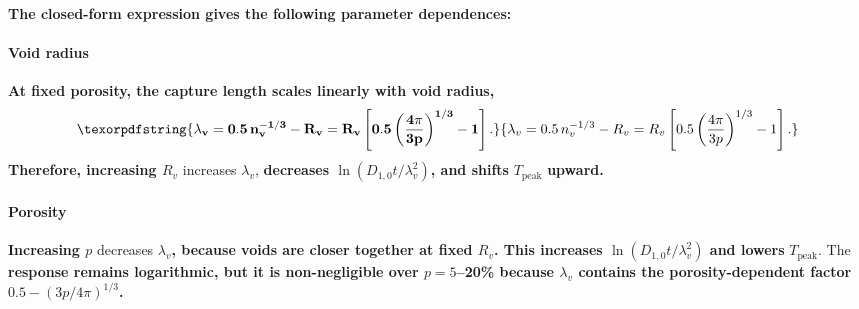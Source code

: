 \documentclass[preprint,12pt,sort&compress]{elsarticle}
\newcommand{\?}{\stackrel{?}{=}}
\providecommand{\DIFaddtex}[1]{{\bf #1}} %
\providecommand{\DIFdeltex}[1]{} %
\providecommand{\DIFaddbegin}{\protect\color{blue}} %
\providecommand{\DIFaddend}{\protect\color{black}} %
\providecommand{\DIFdelbegin}{\protect\color{red}} %
\providecommand{\DIFdelend}{\protect\color{black}} %
\providecommand{\DIFadd}[1]{\texorpdfstring{\DIFaddtex{#1}}{#1}} %
\providecommand{\DIFdel}[1]{\texorpdfstring{\DIFdeltex{#1}}{}} %
\begin{document}
\DIFdelbegin \DIFdel{\Cref{Eq:App:TstarExplicit} yields the following parametric trends, consistent with \cref{Fig:Delta_sigma}:
}%
\DIFdel{\textit{Increasing $R_v$} }\DIFdelend \DIFaddbegin \DIFadd{The closed-form expression gives the following parameter dependences:
}\paragraph{\DIFadd{Void radius}} \DIFadd{At fixed porosity, the capture length scales linearly with void radius,
}\begin{equation}
\DIFadd{\lambda_v = 0.5\,n_v^{-1/3}-R_v = R_v \left[ 0.5 \left( \frac{4\pi}{3p} \right)^{1/3} - 1 \right].
}\end{equation}
\DIFadd{Therefore, increasing $R_v$ }\DIFaddend increases $\lambda_v$, \DIFdelbegin \DIFdel{decreasing the logarithm and therefore increasing }\DIFdelend \DIFaddbegin \DIFadd{decreases $\ln(D_{1,0}t/\lambda_v^2)$, and shifts }\DIFaddend $T_\text{peak}$ \DIFdelbegin \DIFdel{. The $\sim$180~K upwardshift from $R_v = 1$~nm to $R_v = 10$~nm reported in \cref{Sec:Oxygen} is reproduced quantitatively.
}%
\DIFdel{\textit{Increasing $p$} }\DIFdelend \DIFaddbegin \DIFadd{upward.
}

\paragraph{\DIFadd{Porosity}} \DIFadd{Increasing $p$ }\DIFaddend decreases $\lambda_v$\DIFdelbegin \DIFdel{and slightly decreases }\DIFdelend \DIFaddbegin \DIFadd{, because voids are closer together at fixed $R_v$. This increases $\ln(D_{1,0}t/\lambda_v^2)$ and lowers }\DIFaddend $T_\text{peak}$. The \DIFdelbegin \DIFdel{effect is weak because $p$ enters through a logarithm.
}%
\DIFdel{\textit{Increasing $c_\mathrm{O}$} increases the denominator of the logarithm's argument and slightly increases $T_\text{peak}$; again, the effect is logarithmic and weak.
}%
\DIFdel{\textit{Stoichiometry} enters the numerator through }\DIFdelend \DIFaddbegin \DIFadd{response remains logarithmic, but it is non-negligible over $p=5$--20\% because $\lambda_v$ contains the porosity-dependent factor $0.5-(3p/4\pi)^{1/3}$.
}
\end{document}
